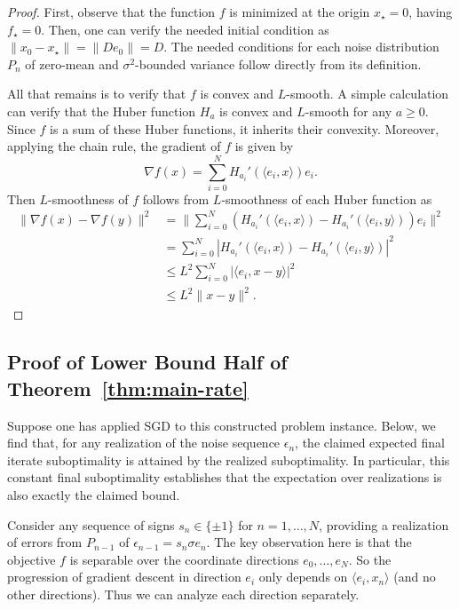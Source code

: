 \documentclass[11pt, hidelinks]{article}
\begin{document}
\begin{proof}
    First, observe that the function $f$ is minimized at the origin $x_\star=0$, having $f_\star=0$. Then, one can verify the needed initial condition as $\|x_0-x_\star\|=\|De_0\|=D$. The needed conditions for each noise distribution $P_n$ of zero-mean and $\sigma^2$-bounded variance follow directly from its definition.
    
    All that remains is to verify that $f$ is convex and $L$-smooth. A simple calculation can verify that the Huber function $H_a$ is convex and $L$-smooth for any $a\geq 0$. Since $f$ is a sum of these Huber functions, it inherits their convexity. Moreover, applying the chain rule, the gradient of $f$ is given by
    \begin{equation*}
        \nabla f(x) = \sum_{i=0}^N H_{a_i}'(\langle e_i,x\rangle)e_i.
    \end{equation*}
    Then $L$-smoothness of $f$ follows from $L$-smoothness of each Huber function as
    \begin{align*}
        \|\nabla f(x)-\nabla f(y)\|^2 &= \|\sum_{i=0}^N (H_{a_i}'(\langle e_i,x\rangle) - H_{a_i}'(\langle e_i,y\rangle))e_i\|^2\\
        &=\sum_{i=0}^N |H_{a_i}'(\langle e_i,x\rangle) - H_{a_i}'(\langle e_i,y\rangle)|^2\\
        &\leq L^2\sum_{i=0}^N |\langle e_i, x-y\rangle|^2\\
        &\leq L^2 \|x-y\|^2.
    \end{align*}
\end{proof}

\subsection{Proof of Lower Bound Half of Theorem~\ref{thm:main-rate}}
    Suppose one has applied SGD to this constructed problem instance. Below, we find that, for any realization of the noise sequence $\epsilon_n$, the claimed expected final iterate suboptimality is attained by the realized suboptimality. In particular, this constant final suboptimality establishes that the expectation over realizations is also exactly the claimed bound.

    Consider any sequence of signs $s_{n}\in\{\pm 1\}$ for $n=1,\dots,N$, providing a realization of errors from $P_{n-1}$ of $\epsilon_{n-1} = s_n \sigma e_n$. The key observation here is that the objective $f$ is separable over the coordinate directions $e_0,\dots,e_N$. So the progression of gradient descent in direction $e_i$ only depends on $\langle e_i, x_n\rangle$ (and no other directions). Thus we can analyze each direction separately.
\end{document}
